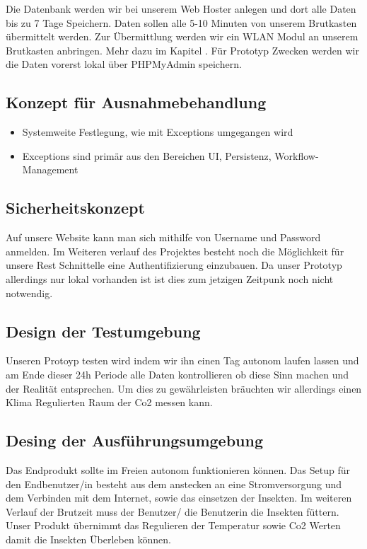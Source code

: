 	Die Datenbank werden wir bei unserem Web Hoster anlegen und dort alle Daten bis zu 7 Tage Speichern. Daten sollen alle 5-10 Minuten von unserem Brutkasten übermittelt werden. Zur Übermittlung werden wir ein WLAN Modul an unserem Brutkasten anbringen. Mehr dazu im Kapitel . Für Prototyp Zwecken werden wir die Daten vorerst lokal über PHPMyAdmin speichern.
	\newpage
	\def \currentAuthor{}
\subsection{Konzept für Ausnahmebehandlung}
\begin{itemize}
	\item Systemweite Festlegung, wie mit Exceptions umgegangen wird
	\item Exceptions sind primär aus den Bereichen UI, Persistenz, Workflow-Management
\end{itemize}
	\newpage
	\def \currentAuthor{Florian Tipotsch}
\subsection{Sicherheitskonzept}

Auf unsere Website kann man sich mithilfe von Username und Password anmelden. Im Weiteren verlauf des Projektes besteht noch die Möglichkeit für unsere Rest Schnittelle eine Authentifizierung einzubauen. Da unser Prototyp allerdings nur lokal vorhanden ist ist dies zum jetzigen Zeitpunk noch nicht notwendig.

\subsection{Design der Testumgebung}
Unseren Protoyp testen wird indem wir ihn einen Tag autonom laufen lassen und am Ende dieser 24h Periode alle Daten kontrollieren ob diese Sinn machen und der Realität entsprechen. Um dies zu gewährleisten bräuchten wir allerdings einen Klima Regulierten Raum der Co2 messen kann.

\subsection{Desing der Ausführungsumgebung}
Das Endprodukt sollte im Freien autonom funktionieren können. Das Setup für den Endbenutzer/in besteht aus dem anstecken an eine Stromversorgung und dem Verbinden mit dem Internet, sowie das einsetzen der Insekten. Im weiteren Verlauf der Brutzeit muss der Benutzer/ die Benutzerin die Insekten füttern. Unser Produkt übernimmt das Regulieren der Temperatur sowie Co2 Werten damit die Insekten Überleben können.

